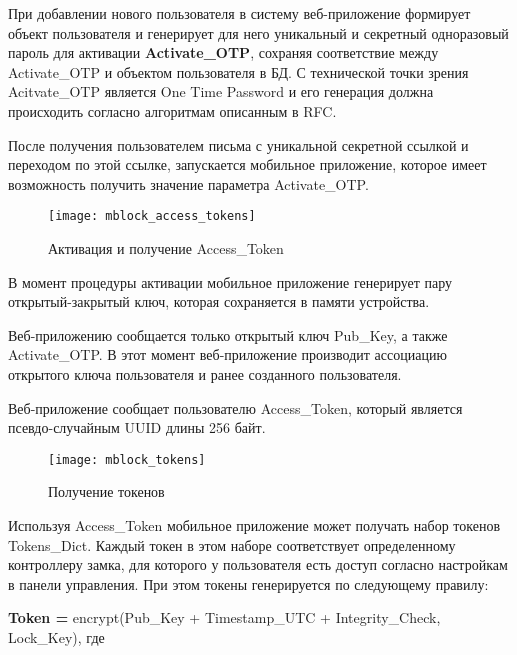 При добавлении нового пользователя в систему веб-приложение формирует объект пользователя и генерирует для него уникальный и секретный одноразовый пароль для активации \textbf{Activate\_OTP}, сохраняя соответствие между Activate\_OTP и объектом пользователя в БД. С технической точки зрения Acitvate\_OTP является One Time Password и его генерация должна происходить согласно алгоритмам описанным в RFC.

После получения пользователем письма с уникальной секретной ссылкой и переходом по этой ссылке, запускается мобильное приложение, которое имеет возможность получить значение параметра Activate\_OTP. 

\begin{figure}[ht] %
	\centering
	\texttt{[image: mblock\_access\_tokens]}\\ %
	\caption{Активация и получение Access\_Token}%
	\label{mblock_access_token}%
\end{figure}

В момент процедуры активации мобильное приложение генерирует пару открытый-закрытый ключ, которая сохраняется в памяти устройства. 

Веб-приложению сообщается только открытый ключ Pub\_Key, а также Activate\_OTP. В этот момент веб-приложение производит ассоциацию открытого ключа пользователя и ранее созданного пользователя.

Веб-приложение сообщает пользователю Access\_Token, который является псевдо-случайным UUID длины 256 байт.

\begin{figure}[ht] %
	\centering
	\texttt{[image: mblock\_tokens]}\\ %
	\caption{Получение токенов}%
	\label{mblock_tokens}%
\end{figure}

Используя Access\_Token мобильное приложение может получать набор токенов Tokens\_Dict. Каждый токен в этом наборе соответствует определенному контроллеру замка, для которого у пользователя есть доступ согласно настройкам в панели управления. При этом токены генерируется по следующему правилу:

\textbf{Token = }encrypt(Pub\_Key + Timestamp\_UTC + Integrity\_Check, Lock\_Key), где

